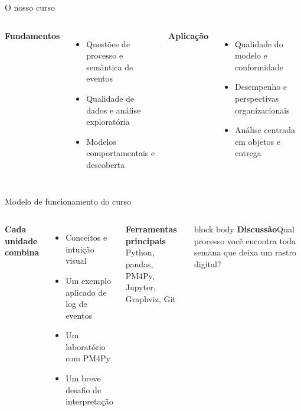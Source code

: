 \documentclass[aspectratio=169,11pt]{beamer}
\newcommand{\promptbox}[1]{%
  \begin{beamercolorbox}[rounded=true,sep=0.65em]{block body}
    \textbf{\color{Coral}Discussão}\quad #1
  \end{beamercolorbox}
}
\begin{document}
\begin{frame}{O nosso curso}
  \centering

  \vspace{0.65cm}
  \begin{columns}[T,onlytextwidth]
      \textbf{Fundamentos}
      \begin{itemize}
        \item Questões de processo e semântica de eventos
        \item Qualidade de dados e análise exploratória
        \item Modelos comportamentais e descoberta
      \end{itemize}
      \textbf{Aplicação}
      \begin{itemize}
        \item Qualidade do modelo e conformidade
        \item Desempenho e perspectivas organizacionais
        \item Análise centrada em objetos e entrega
      \end{itemize}
  \end{columns}
\end{frame}

\begin{frame}{Modelo de funcionamento do curso}
  \begin{columns}[T,onlytextwidth]
      \textbf{Cada unidade combina}
      \begin{itemize}
        \item Conceitos e intuição visual
        \item Um exemplo aplicado de log de eventos
        \item Um laboratório com PM4Py
        \item Um breve desafio de interpretação
      \end{itemize}
      \vspace{0.3cm}
      \textbf{Ferramentas principais}\\
      Python, pandas, PM4Py, Jupyter, Graphviz, Git
      \promptbox{Qual processo você encontra toda semana que deixa um rastro digital?}
  \end{columns}
\end{frame}
\end{document}
